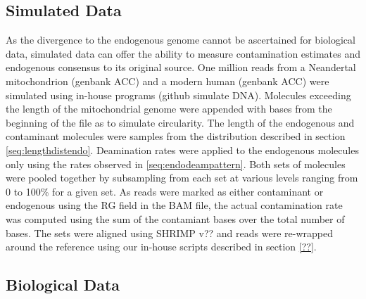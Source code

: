 \documentclass[a4paper,12pt]{article}
\begin{document}
{%



\subsection{Simulated Data}

As the divergence to the endogenous genome cannot be ascertained for biological data, simulated data can offer the ability to measure contamination estimates and endogenous consensus to its original source. One million reads from a Neandertal mitochondrion (genbank ACC) and a modern human (genbank ACC) were simulated using in-house programs (github simulate DNA). Molecules exceeding the length of the mitochondrial genome were appended with bases from the beginning of the file as to simulate circularity. The length of the endogenous and contaminant molecules were samples from the distribution described in section \ref{seq:lengthdistendo}. Deamination rates were applied to the endogenous molecules only using the rates observed in \ref{seq:endodeampattern}. %
Both sets of molecules were pooled together by subsampling from each set at various levels ranging from 0 to 100\% for a given set. As reads were marked as either contaminant or endogenous using the RG field in the BAM file, the actual contamination rate was computed using the sum of the contamiant bases over the total number of bases. The sets were aligned using SHRIMP v?? and reads were re-wrapped around the reference using our in-house scripts described in section \ref{??}. 



\subsection{Biological Data}

\clearpage



}
\end{document}
